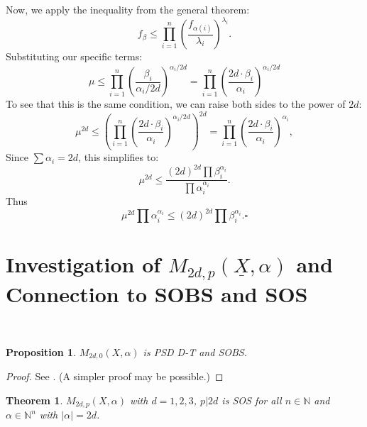 \documentclass{article}
\newtheorem{theorem}{Theorem}
\newtheorem{proposition}{Proposition}
\begin{document}
Now, we apply the inequality from the general theorem:
$$f_{\beta}\le\prod_{i=1}^{n}(\frac{f_{\alpha(i)}}{\lambda_{i}})^{\lambda_{i}}.$$
Substituting our specific terms:
$$\mu\le\prod_{i=1}^{n}(\frac{\beta_{i}}{\alpha_{i}/2d})^{\alpha_{i}/2d}=\prod_{i=1}^{n}(\frac{2d\cdot\beta_{i}}{\alpha_{i}} )^{\alpha_{i} / 2d}$$
To see that this is the same condition, we can raise both sides to the power of $2d$:
$$\mu^{2d}\le(\prod_{i=1}^{n}(\frac{2d\cdot\beta_{i}}{\alpha_{i}})^{\alpha_{i}/2d} )^{2d}=\prod_{i=1}^{n}(\frac{2d\cdot\beta_{i}}{\alpha_{i}})^{\alpha_{i}},$$ Since $\sum\alpha_i=2d$, this simplifies to:
$$\mu^{2d} \le \frac{(2d)^{2d} \prod \beta_i^{\alpha_i}}{\prod \alpha_i^{\alpha_i}}.$$
Thus 
$$\mu^{2d}\prod \alpha_i^{\alpha_i}\le(2d)^{2d} \prod \beta_i^{\alpha_i}.\square$$

\section{Investigation of $M_{2d, p}(\underline{X}, \alpha)$ and Connection to SOBS and SOS}
\label{s03}
~~
\begin{proposition}
$M_{2d,0}(X, \alpha)$ is PSD D-T and SOBS.
\end{proposition}

\begin{proof}
See \cite{GM01}. (A simpler proof may be possible.)
\end{proof}

\begin{theorem}
$M_{2d,p}(X, \alpha)$ with $d=1,2,3$, $p|2d$ is SOS for all $n \in \mathbb{N}$ and $\alpha \in \mathbb{N}^n$ with 
$|\alpha|=2d$.
\end{theorem}
\end{document}
